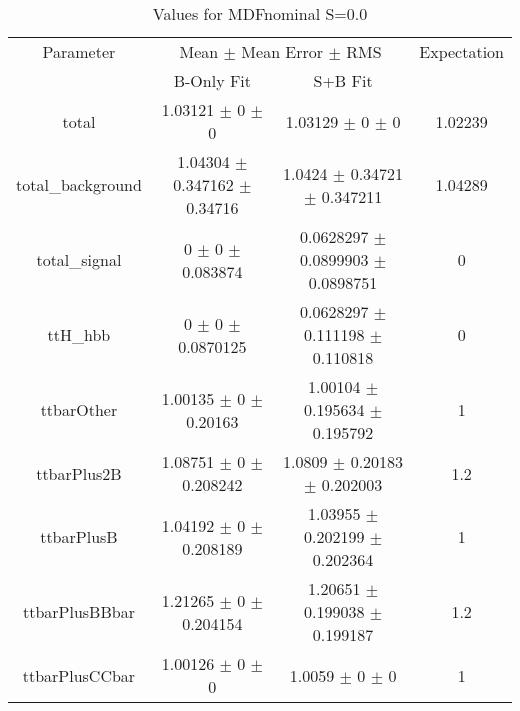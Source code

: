 \begin{table}
\centering
\caption{Values for MDFnominal S=0.0}
\begin{tabular}{cccc}
\toprule
Parameter & \multicolumn{2}{c}{Mean $\pm$ Mean Error $\pm$ RMS} & Expectation\\
 & B-Only Fit & S+B Fit & \\
\midrule
total & \num{1.03121} $\pm$ \num{0} $\pm$ \num{0} & \num{1.03129} $\pm$ \num{0} $\pm$ \num{0} & \num{1.02239}\\
total\_background & \num{1.04304} $\pm$ \num{0.347162} $\pm$ \num{0.34716} & \num{1.0424} $\pm$ \num{0.34721} $\pm$ \num{0.347211} & \num{1.04289}\\
total\_signal & \num{0} $\pm$ \num{0} $\pm$ \num{0.083874} & \num{0.0628297} $\pm$ \num{0.0899903} $\pm$ \num{0.0898751} & \num{0}\\
ttH\_hbb & \num{0} $\pm$ \num{0} $\pm$ \num{0.0870125} & \num{0.0628297} $\pm$ \num{0.111198} $\pm$ \num{0.110818} & \num{0}\\
ttbarOther & \num{1.00135} $\pm$ \num{0} $\pm$ \num{0.20163} & \num{1.00104} $\pm$ \num{0.195634} $\pm$ \num{0.195792} & \num{1}\\
ttbarPlus2B & \num{1.08751} $\pm$ \num{0} $\pm$ \num{0.208242} & \num{1.0809} $\pm$ \num{0.20183} $\pm$ \num{0.202003} & \num{1.2}\\
ttbarPlusB & \num{1.04192} $\pm$ \num{0} $\pm$ \num{0.208189} & \num{1.03955} $\pm$ \num{0.202199} $\pm$ \num{0.202364} & \num{1}\\
ttbarPlusBBbar & \num{1.21265} $\pm$ \num{0} $\pm$ \num{0.204154} & \num{1.20651} $\pm$ \num{0.199038} $\pm$ \num{0.199187} & \num{1.2}\\
ttbarPlusCCbar & \num{1.00126} $\pm$ \num{0} $\pm$ \num{0} & \num{1.0059} $\pm$ \num{0} $\pm$ \num{0} & \num{1}\\
\bottomrule
\end{tabular}
\end{table}